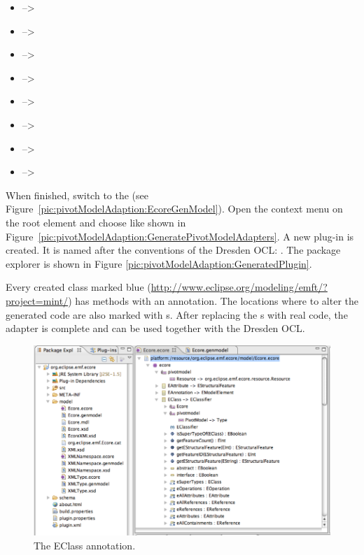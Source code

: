 \begin{itemize}
  \item {} --\textgreater {}
  \item {} --\textgreater {}
  \item {} --\textgreater {}
  \item {} --\textgreater {}
  \item {} --\textgreater {}
  \item {} --\textgreater {}
  \item {} --\textgreater {}
  \item {} --\textgreater {}
\end{itemize}

When finished, switch to the  (see 
Figure~\ref{pic:pivotModelAdaption:EcoreGenModel}). Open the context menu on 
the root element and choose  like shown in
Figure~\ref{pic:pivotModelAdaption:GeneratePivotModelAdapters}. A new plug-in 
is created. It is named after the conventions of the Dresden OCL:
. The package explorer is shown in Figure \ref{pic:pivotModelAdaption:GeneratedPlugin}.

Every created class marked blue 
(\url{http://www.eclipse.org/modeling/emft/?project=mint/}) has methods with an
 annotation. The locations where to alter the generated code 
are also marked with s. After replacing the s with real 
code, the adapter is complete and can be used together with the Dresden OCL.

\begin{figure}[!b]
	\centering
	\includegraphics[width=1.0\linewidth]{figures/pivotModelAdaption/EClassAnnotation}
	\caption{The EClass annotation.}
	\label{pic:pivotModelAdaption:EClassAnnotation}
\end{figure}

